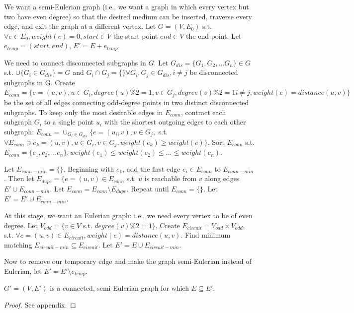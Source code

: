 We want a semi-Eulerian graph (i.e., we want a graph in which every vertex but two have even degree) so that the desired medium can be inserted, traverse every edge, and exit the graph at a different vertex.  Let $G=(V,E_0)$ s.t. $\forall e \in E_0, weight(e)=0, start \in V $ the start point $end \in V$ the end point.  Let $e_{temp} = (start, end)$, $E' = E + e_{temp}$.

We need to connect disconnected subgraphs in $G$.  Let $G_{dis} = \{G_1, G_2, ... G_n\} \in G$ s.t. $\cup{\{G_i \in G_{dis}\}} = G$ and $G_i \cap G_j  = \{ \} \forall G_i, G_j \in G_{dis}, i\neq j$ be disconnected subgraphs in G.  Create $E_{conn} = \{e = (u, v), u \in G_i, degree(u)\%2 = 1, v \in G_j, degree(v) \%2 = 1 i \neq j, weight(e) = distance(u, v)\}$ be the set of all edges connecting odd-degree points in two distinct disconnected subgraphs.  To keep only the most desirable edges in $E_{conn}$, contract each subgraph $G_i$ to a single point $u_i$ with the shortest outgoing edges to each other subgraph: $E_{conn} = \cup_{G_i \in G_{dis}} \{e=(u_i, v), v \in G_j,$ s.t. $\forall E_{conn} \ni e_k = (u, v), u \in G_i, v \in G_j, weight(e_k) \geq weight(e)\}$.  Sort $E_{conn}$ s.t. $E_{conn} = \{e_1, e_2, ... e_n\}, weight(e_1) \leq weight(e_2) \leq \ldots \leq weight(e_n)$.

Let $E_{conn-min} = \{ \}$.  Beginning with $e_1$, add the first edge $e_i \in E_{conn}$ to $E_{conn-min}$.  Then let $E_{dupe} = \{ e = (u, v) \in E_{conn}$ s.t. $u$  is reachable from $v$ along edges $E' \cup E_{conn-min}$.  Let $E_{conn} = E_{conn} \setminus E_{dupe}$.  Repeat until $E_{conn} = \{ \}$.  Let $E' = E' \cup E_{conn-min}$.

At this stage, we want an Eulerian graph: i.e., we need every vertex to be of even degree.  Let $V_{odd} = \{ v \in V$ s.t. $degree(v) \% 2 = 1 \}$.  Create $E_{circuit} = V_{odd} \times V_{odd}$, s.t. $\forall e=(u,v) \in E_{circuit}, weight(e) = distance(u, v)$.  Find minimum matching $E_{circuit-min} \subseteq E_{circuit}$.  Let $E' = E \cup E_{circuit-min}$.

Now to remove our temporary edge and make the graph semi-Eulerian instead of Eulerian, let $E' = E' \setminus e_{temp}$.
{
\renewcommand{\thetheorem}{\ref{thm:graphness}}
\begin{theorem}
 $G' = (V, E')$ is a connected, semi-Eulerian graph for which $E \subseteq E'$.
\end{theorem}
\addtocounter{theorem}{-1}
}
\begin{proof}
See appendix.
\end{proof}

